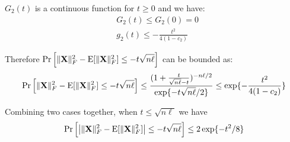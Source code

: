 $G_2(t)$ is a continuous function for $t\geq 0$ and we have:
\begin{equation}
\begin{split}
    &G_2(t) \leq G_2(0) = 0 \\
    & g_2(t) \leq -\frac{t^2}{4(1-c_2)}
\end{split}
\end{equation}

Therefore $\Pr\left[ \|\mathbf{X}\|^2_F - \mathrm{E}[\|\mathbf{X}\|^2_F] \leq -t \sqrt{n\ell} \right]$ can be bounded as:
\begin{equation}
\begin{split}
     \Pr\left[ \|\mathbf{X}\|^2_F - \mathrm{E}[\|\mathbf{X}\|^2_F] \leq -t \sqrt{n\ell} \right] 
     \leq \frac{(1+\frac{t}{\sqrt{n\ell}-t})^{-n\ell/2}}{\exp \{-t\sqrt{n\ell}/2\}} 
      \leq \exp\{-\frac{t^2}{4(1-c_2)}\}
\end{split}
\end{equation}

Combining two cases together, when $t \leq \sqrt{n\ell}$ we have
\begin{equation}
\begin{split}
     \Pr\left[ \left|\|\mathbf{X}\|^2_F - \mathrm{E}[\|\mathbf{X}\|^2_F]\right| \leq -t \sqrt{n\ell} \right] 
     \leq 2 \exp\{-t^2/8\}
\end{split}
\end{equation}




